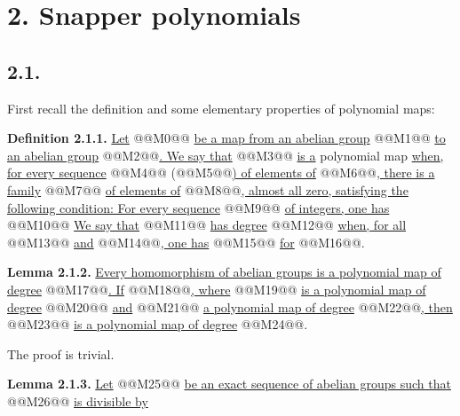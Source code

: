 
\section*{2. Snapper polynomials}

\subsection*{2.1.}
First recall the definition and some elementary properties of polynomial maps:

\textbf{Definition 2.1.1.} \uline{Let} @@M0@@ \uline{be a map from an abelian group} @@M1@@ \uline{to an abelian group} @@M2@@\uline{. We say that} @@M3@@ \uline{is a} polynomial map \uline{when, for every sequence} @@M4@@ (@@M5@@\uline{) of elements of} @@M6@@\uline{, there is a family} @@M7@@ \uline{of elements of} @@M8@@\uline{, almost all zero, satisfying the following condition: For every sequence} @@M9@@ \uline{of integers, one has}
@@M10@@
\uline{We say that} @@M11@@ \uline{has degree} @@M12@@ \uline{when, for all} @@M13@@ \uline{and} @@M14@@\uline{, one has}
@@M15@@
\uline{for} @@M16@@.

\textbf{Lemma 2.1.2.} \uline{Every homomorphism of abelian groups is a polynomial map of degree} @@M17@@\uline{. If} @@M18@@\uline{, where} @@M19@@ \uline{is a polynomial map of degree} @@M20@@ \uline{and} @@M21@@ \uline{a polynomial map of degree} @@M22@@\uline{, then} @@M23@@ \uline{is a polynomial map of degree} @@M24@@.

The proof is trivial.

\textbf{Lemma 2.1.3.} \uline{Let}
@@M25@@
\uline{be an exact sequence of abelian groups such that} @@M26@@ \uline{is divisible by}


